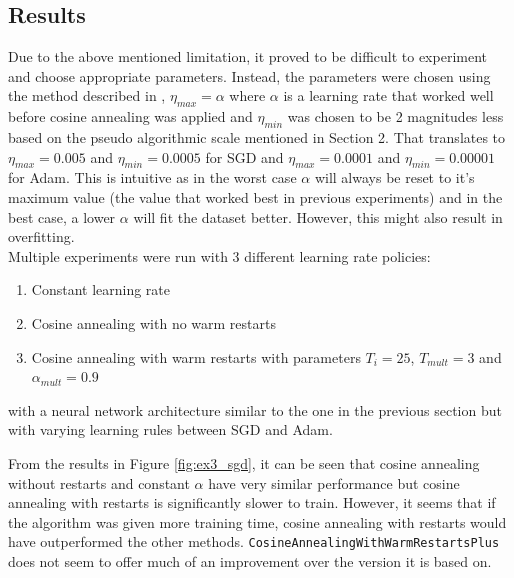 \documentclass{article}
\begin{document}
\subsection{Results}
Due to the above mentioned limitation, it proved to be difficult to experiment and choose appropriate parameters. Instead, the parameters were chosen using the method described in \citep{SGDR}, $\eta_{max} = \alpha$ where $\alpha$ is a learning rate that worked well before cosine annealing was applied and $\eta_{min}$ was chosen to be 2 magnitudes less based on the pseudo algorithmic scale mentioned in Section 2. That translates to $\eta_{max} = 0.005$ and $\eta_{min} = 0.0005$ for SGD and $\eta_{max} = 0.0001$ and $\eta_{min} = 0.00001$ for Adam. This is intuitive as in the worst case $\alpha$ will always be reset to it's maximum value (the value that worked best in previous experiments) and in the best case, a lower $\alpha$ will fit the dataset better. However, this might also result in overfitting.
\\
Multiple experiments were run with 3 different learning rate policies:
\begin{enumerate}
    \itemsep0em 
    \item Constant learning rate
    \item Cosine annealing with no warm restarts
    \item Cosine annealing with warm restarts with parameters $T_i = 25$, $T_{mult} = 3$ and $\alpha_{mult} = 0.9$ 
\end{enumerate}
with a neural network architecture similar to the one in the previous section but with varying learning rules between SGD and Adam.

From the results in Figure \ref{fig:ex3_sgd}, it can be seen that cosine annealing without restarts and constant $\alpha$ have very similar performance but cosine annealing with restarts is significantly slower to train. However, it seems that if the algorithm was given more training time, cosine annealing with restarts would have outperformed the other methods. \texttt{CosineAnnealingWithWarmRestartsPlus} does not seem to offer much of an improvement over the version it is based on.
\end{document}
